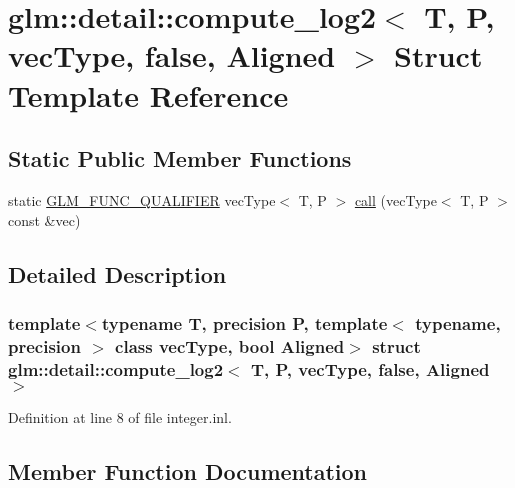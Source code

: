\hypertarget{structglm_1_1detail_1_1compute__log2_3_01_t_00_01_p_00_01vec_type_00_01false_00_01_aligned_01_4}{}\section{glm\+::detail\+::compute\+\_\+log2$<$ T, P, vec\+Type, false, Aligned $>$ Struct Template Reference}
\label{structglm_1_1detail_1_1compute__log2_3_01_t_00_01_p_00_01vec_type_00_01false_00_01_aligned_01_4}
\subsection*{Static Public Member Functions}
\begin{DoxyCompactItemize}
\item 
static \mbox{\hyperlink{setup_8hpp_a33fdea6f91c5f834105f7415e2a64407}{G\+L\+M\+\_\+\+F\+U\+N\+C\+\_\+\+Q\+U\+A\+L\+I\+F\+I\+ER}} vec\+Type$<$ T, P $>$ \mbox{\hyperlink{structglm_1_1detail_1_1compute__log2_3_01_t_00_01_p_00_01vec_type_00_01false_00_01_aligned_01_4_a207c0e9ebab0865aec294f9940bd9c64}{call}} (vec\+Type$<$ T, P $>$ const \&vec)
\end{DoxyCompactItemize}


\subsection{Detailed Description}
\subsubsection*{template$<$typename T, precision P, template$<$ typename, precision $>$ class vec\+Type, bool Aligned$>$\newline
struct glm\+::detail\+::compute\+\_\+log2$<$ T, P, vec\+Type, false, Aligned $>$}



Definition at line 8 of file integer.\+inl.



\subsection{Member Function Documentation}
\mbox{\label{structglm_1_1detail_1_1compute__log2_3_01_t_00_01_p_00_01vec_type_00_01false_00_01_aligned_01_4_a207c0e9ebab0865aec294f9940bd9c64}} 
